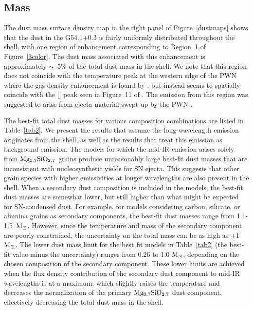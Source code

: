 \documentclass{emulateapj}
\begin{document}



\subsection{Mass} \label{mass}

The dust mass surface density map in the right panel of Figure~\ref{dustmaps} shows that the dust in the G54.1+0.3 is fairly uniformly distributed throughout the shell, with one region of enhancement corresponding to Region~1 of Figure~\ref{3color}. The dust mass associated with this enhancement is approximately $\sim$~5\% of the total dust mass in the shell. We note that this region does not coincide with the temperature peak at the western edge of the PWN where the gas density enhancement is found by \citet{temim10}, but instead seems to spatially coincide with the [] peak seen in Figure~11 of \citet{temim10}. The emission from this region was suggested to arise from ejecta material swept-up by the PWN \citep[see Figure~14 of][]{temim10}.

The best-fit total dust masses for various composition combinations are listed in Table~\ref{tab2}. We present the results that assume the long-wavelength emission originates from the shell, as well as the results that treat this emission as background emission. The models for which the mid-IR emission arises solely from $\rm Mg_{0.7}SiO_{2.7}$ grains produce unreasonably large best-fit dust masses that are inconsistent with nucleosynthetic yields for SN ejecta. This suggests that other grain species with higher emissivities at longer wavelengths are also present in the shell. When a secondary dust composition is included in the models, the best-fit dust masses are somewhat lower, but still higher than what might be expected for SN-condensed dust. For example, for models considering carbon, silicate, or alumina grains as secondary components, the best-fit dust masses range from 1.1-1.5~$\rm M_{\odot}$. However, since the temperature and mass of the secondary component are poorly constrained, the uncertainty on the total mass can be as high as $\pm1$~$\rm M_{\odot}$. The lower dust mass limit for the best fit models in Table~\ref{tab2} (the best-fit value minus the uncertainty) ranges from 0.26 to 1.0 $\rm M_{\odot}$, depending on the chosen composition of the secondary component. These lower limits are achieved when the flux density contribution of the secondary dust component to mid-IR wavelengths is at a maximum, which slightly raises the temperature and decreases the normalization of the primary $\rm Mg_{0.7}SiO_{2.7}$ dust component, effectively decreasing the total dust mass in the shell.
\end{document}
